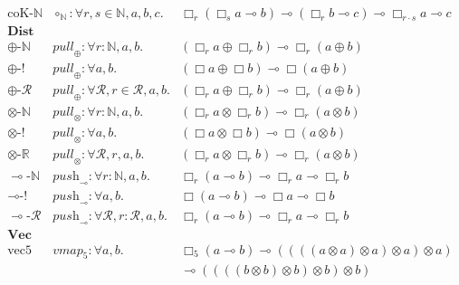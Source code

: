 \begin{table}
{{\begin{align*}
\begin{array}{r|rll}
\text{coK-$\mathbb{N}$} & \circ_{\mathbb{N}} :
\forall r, s \in \mathbb{N}, a, b, c . &
      \Box_r (\Box_s a \multimap b) \multimap (\Box_r b \multimap c) \multimap \Box_{r \cdot s} a \multimap c
\\ \hline
\textbf{Dist} & \\ \hline
\text{$\oplus$-$\mathbb{N}$} & \textit{pull}_\oplus : \forall r :
                               \mathbb{N}, a, b . & (\Box_r a \oplus \Box_r b) \multimap \Box_r (a \oplus b) \\
\text{$\oplus$-!} &  \textit{pull}_\oplus : \forall a, b . & (\Box a \oplus \Box b) \multimap \Box (a \oplus b) \\
\text{$\oplus$-$\mathcal{R}$} & \textit{pull}_\oplus : \forall
                                \mathcal{R}, r \in \mathcal{R}, a, b
                                . &  (\Box_r a \oplus \Box_r b) \multimap \Box_r (a \oplus b) \\
\text{$\otimes$-$\mathbb{N}$} & \textit{pull}_\otimes : \forall r :
                                \mathbb{N}, a, b . & (\Box_r a \otimes \Box_r b) \multimap \Box_r (a \otimes b) \\
\text{$\otimes$-!} & \textit{pull}_\otimes : \forall a, b . & (\Box a \otimes \Box b) \multimap \Box (a \otimes b) \\
\text{$\otimes$-$\mathbb{R}$} & \textit{pull}_\otimes : \forall
                                  \mathcal{R}, r,
                                  a, b . & (\Box_r a \otimes \Box_r b) \multimap \Box_r (a \otimes b)  \\
\text{$\multimap$-$\mathbb{N}$} & \textit{push}_\multimap : \forall r
                                  : \mathbb{N}, a, b . & \Box_r (a \multimap b) \multimap \Box_r a \multimap \Box_r b \\
\text{$\multimap$-!} & \textit{push}_\multimap : \forall a, b . & \Box (a \multimap b) \multimap \Box a \multimap \Box b \\
\text{$\multimap$-$\mathcal{R}$} & \textit{push}_\multimap : \forall
                                   \mathcal{R}, r : \mathcal{R}, a, b
                                   .& \Box_r (a \multimap b) \multimap \Box_r a \multimap \Box_r b \\ \hline
\textbf{Vec} \\ \hline
\text{vec5} & \textit{vmap}_5 : \forall a, b . & \Box_5 (a \multimap b) \multimap ((((a \otimes a) \otimes a) \otimes a) \otimes a) \\
& & \multimap ((((b \otimes b) \otimes b) \otimes b) \otimes b) \\

\end{array}
\end{align*}}}
\end{table}
